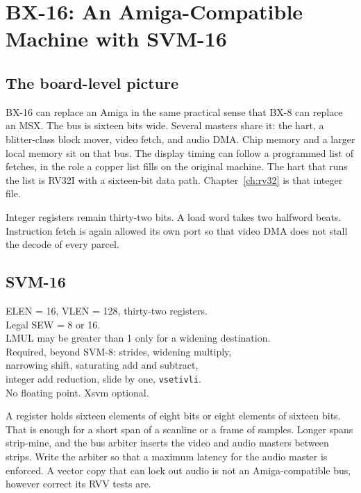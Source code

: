 \chapter{BX-16: An Amiga-Compatible Machine with SVM-16}
\label{ch:bx16}

\section{The board-level picture}

BX-16 can replace an Amiga in the same practical sense that BX-8 can replace an MSX. The bus is sixteen bits wide. Several masters share it: the hart, a blitter-class block mover, video fetch, and audio DMA. Chip memory and a larger local memory sit on that bus. The display timing can follow a programmed list of fetches, in the role a copper list fills on the original machine. The hart that runs the list is RV32I with a sixteen-bit data path. Chapter~\ref{ch:rv32} is that integer file.

Integer registers remain thirty-two bits. A load word takes two halfword beats. Instruction fetch is again allowed its own port so that video DMA does not stall the decode of every parcel.

\section{SVM-16}

\begin{spec}
ELEN = 16, VLEN = 128, thirty-two registers.\\
Legal SEW = 8 or 16.\\
LMUL may be greater than 1 only for a widening destination.\\
Required, beyond SVM-8: strides, widening multiply,\\
narrowing shift, saturating add and subtract,\\
integer add reduction, slide by one, \texttt{vsetivli}.\\
No floating point. Xsvm optional.
\end{spec}

A register holds sixteen elements of eight bits or eight elements of sixteen bits. That is enough for a short span of a scanline or a frame of samples. Longer spans strip-mine, and the bus arbiter inserts the video and audio masters between strips. Write the arbiter so that a maximum latency for the audio master is enforced. A vector copy that can lock out audio is not an Amiga-compatible bus, however correct its RVV tests are.

